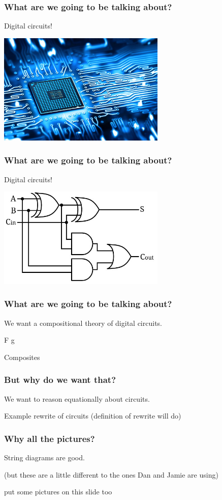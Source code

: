 \begin{frame}
    \frametitle{What are we going to be talking about?}
    \pause
    \centering
    \LARGE
    Digital circuits!

    \includegraphics[width=0.6\textwidth]{imgs/circuit}
\end{frame}
\begin{frame}
    \frametitle{What are we going to be talking about?}
    \centering
    \LARGE
    Digital circuits!

    \includegraphics[width=0.6\textwidth]{imgs/adder}
\end{frame}
\begin{frame}
    \frametitle{What are we going to be talking about?}

    \pause

    \centering
    \LARGE
    We want a \alert{compositional} theory of digital circuits.

    \vspace{0.5em}

    \normalsize

    \pause
    F g

    \vspace{0.5em}
    Composites

    \pause
    \vspace{0.5em}

\end{frame}
\begin{frame}
    \frametitle{But why do we want that?}
    \centering
    \LARGE
    We want to reason \alert{equationally} about circuits.

    \normalsize
    Example rewrite of circuits (definition of rewrite will do)

\end{frame}
\begin{frame}
    \frametitle{Why all the pictures?}
    \centering
    \LARGE
    String diagrams are \alert{good}.

    \normalsize
    (but these are a little different to the ones Dan and Jamie are using)

    put some pictures on this slide too

\end{frame}
